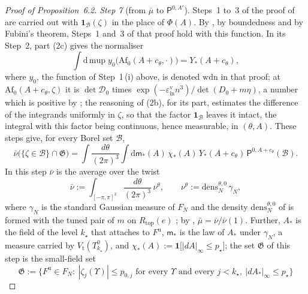 \documentclass[11pt]{amsart}
\theoremstyle{definition}
\begin{document}
\begin{proof}[Proof of Proposition~6.2]
\emph{Step 7} (from $\bar\mu$ to $\mathsf P^{0,A'}$).
Steps~1 to~3 of the proof of \cite[Proposition~29\,(c)]{QEDIII} are carried out with $\mathbf 1_{\mathcal B}(\zeta)$ in the place of $\Phi(A)$.
By \cite[Chapter~29, Lemma~2\,(t6)--(t8)]{QEDIII}, by boundedness and by Fubini's theorem, Steps~1 and~3 of that proof hold with this function.
In its Step~2, part (2c) gives the normaliser
\begin{equation*}
\int\mathrm d\,\mathrm{mup}\;y_0\bigl(\mathrm{Af}_0(A+c_\theta,\cdot)\bigr)=Y_*(A+c_\theta),
\end{equation*}
where $y_0$, the function of Step~1\,(i) above, is denoted $\mathrm{wdn}$ in that proof;
at $\mathrm{Af}_0(A+c_\theta,\zeta)$ it is $\det\mathcal D_0$ times $\exp(-\varepsilon^{\mathrm v}_{\mathrm{in}}n^3)/\det(D_0+m\eta)$, a number which is positive by \cite[Proposition~31.1\,(a)]{QEDIII};
the reasoning of (2b), for its part, estimates the difference of the integrands uniformly in $\zeta$, so that the factor $\mathbf 1_{\mathcal B}$ leaves it intact, the integral with this factor being continuous, hence measurable, in $(\theta,A)$.
These steps give, for every Borel set $\mathcal B$,
\begin{equation*}
\bar\nu\bigl(\{\zeta\in\mathcal B\}\cap\mathfrak G\bigr)=\int\frac{d\theta}{(2\pi)^3}\int\mathrm d\mathsf m_*(A)\,\chi_*(A)\,Y_*(A+c_\theta)\,\mathsf P^{0,A+c_\theta}(\mathcal B).
\end{equation*}
In this step $\bar\nu$ is the average over the twist
\begin{equation*}
\bar\nu:=\int_{[-\pi,\pi]^3}\frac{d\theta}{(2\pi)^3}\,\nu^\theta,\qquad\nu^\theta:=\mathrm{dens}^{\theta,0}_N\,\gamma_N,
\end{equation*}
where $\gamma_N$ is the standard Gaussian measure of $F_N$ and the density $\mathrm{dens}^{\theta,0}_N$ of \cite[(I.7.2)]{QEDIII} is formed with the tuned pair of $m$ on $R_{\mathrm{top}}(e)$ \cite[Section~I.7.3]{QEDIII};
by \cite[Proposition~31.1\,(c)]{QEDIII}, $\bar\mu=\bar\nu/\bar\nu(1)$.
Further, $A_*$ is the field of the level $k_\star$ that \cite[Definition~5.11]{QEDI} attaches to $F^{\mathrm u}$, $\mathsf m_*$ is the law of $A_*$ under $\gamma_N$, a measure carried by $V_{\mathrm t}(T^0_{k_\star})$, and $\chi_*(A):=\mathbf 1\bigl[|dA|_\infty\le p_\star\bigr]$;
the set $\mathfrak G$ of this step is the small-field set
\begin{equation*}
\mathfrak G:=\bigl\{F^{\mathrm u}\in F_N:\ |\zeta_j(\Upsilon)|\le p_{0,j}\text{ for every }\Upsilon\text{ and every }j<k_\star,\ |dA_*|_\infty\le p_\star\bigr\}

\end{equation*}
\end{proof}
\end{document}
